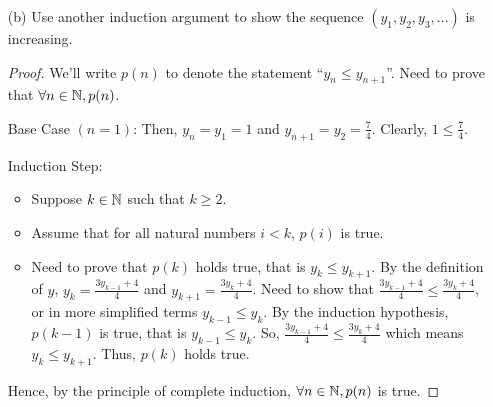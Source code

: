 \documentclass[12pt,letterpaper]{article}
\begin{document}
\begin{itemize}[leftmargin=!,labelindent=5pt]
\begin{itemize}
\begin{proof}
                    Induction Step:
                        \begin{itemize}
                            \item Suppose $k \in \bbN$ such that $k \geq 2$.
                            \item Assume that for all natural numbers $i < k$, $y_{i+1} < 4$.
                            \item Need to prove that $y_k < 4$, that is $\frac{3y_{k-1}+4}{4} = \frac{3}{4} y_{k-1} + 1 < 4$.
                            By the induction hypothesis, $y_{k-1} < 4$. So, $\frac{3}{4}y_{k-1} < 3$ which means $\frac{3}{4}y_{k-1} + 1 < 4$.
                            So, $y_k < 4$.
                        \end{itemize}
                    Hence, by the principle of complete induction, $\forall n \in \bbN, y_n < 4$.
                \end{proof}
            \item [(b)] Use another induction argument to show the sequence $(y_1, y_2, y_3, ...)$ is increasing.
                
                \begin{proof}
                    We'll write $p(n)$ to denote the statement \enquote{$y_n \leq y_{n+1}$}. Need to prove that $\forall n \in \mathbb{N}, p(n)$.

                    Base Case $(n=1)$: Then, $y_n = y_1 = 1$ and $y_{n+1} = y_2 = \frac{7}{4}$. Clearly, $1 \leq \frac{7}{4}$.

                    Induction Step:
                        \begin{itemize}
                            \item Suppose $k \in \bbN$ such that $k \geq 2$.
                            \item Assume that for all natural numbers $i < k$, $p(i)$ is true.
                            \item Need to prove that $p(k)$ holds true, that is $y_k \leq y_{k+1}$.
                            By the definition of $y$, $y_k = \frac{3y_{k-1} + 4}{4}$ and $y_{k+1} = \frac{3y_{k} + 4}{4}$.
                            Need to show that $\frac{3y_{k-1} + 4}{4} \leq \frac{3y_{k} + 4}{4}$, or in more simplified terms $y_{k-1} \leq y_{k}$.
                            By the induction hypothesis, $p(k-1)$ is true, that is $y_{k-1} \leq y_{k}$. 
                            So, $\frac{3y_{k-1} + 4}{4} \leq \frac{3y_{k} + 4}{4}$ which means $y_k \leq y_{k+1}$. Thus, $p(k)$ holds true.
                        \end{itemize}
                    
                    Hence, by the principle of complete induction, $\forall n \in \mathbb{N}, p(n)$ is true.
                \end{proof}
        \end{itemize}
\end{itemize}
\end{document}
